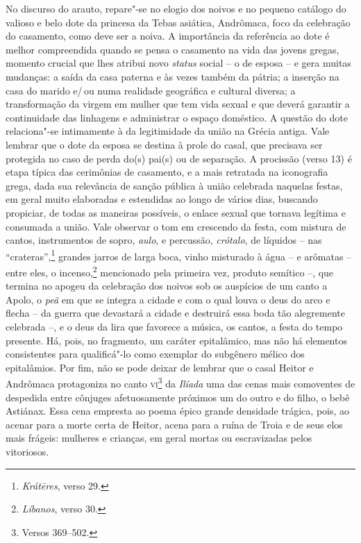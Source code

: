 {No discurso do arauto, repare"-se no
elogio dos noivos e no pequeno catálogo do valioso e belo dote da princesa da
Tebas asiática, Andrômaca, foco da celebração do casamento, como deve ser a noiva.
A importância da
referência ao dote é melhor
compreendida quando se pensa o casamento na vida das jovens gregas, momento
crucial que lhes atribui novo \textit{status} social -- o de esposa -- e gera
muitas mudanças: a saída da casa paterna e às vezes também da pátria; a
inserção na casa do marido e/\,ou numa realidade geográfica e cultural diversa; a
transformação da virgem em mulher que tem vida sexual e que deverá garantir a
continuidade das linhagens e administrar o espaço doméstico. A questão do dote
relaciona"-se intimamente à da legitimidade da união na Grécia antiga. Vale
lembrar que o dote da esposa se destina à prole do casal, que precisava ser
protegida no caso de perda do(s) pai(s) ou de separação. A procissão (verso
13) é etapa típica das cerimônias de casamento, e a mais retratada na iconografia grega, dada sua relevância de sanção pública à união celebrada naquelas festas, em geral muito elaboradas e
estendidas ao longo de vários dias, buscando propiciar, de todas as maneiras
possíveis, o enlace sexual que tornava legítima e consumada a união.
Vale observar o tom em crescendo da festa, com mistura de cantos, instrumentos de sopro, \textit{aulo}, e percussão, \textit{crótalo}, de líquidos -- nas ``crateras'',\footnote{\textit{Krátēres}, verso 29.} grandes jarros de larga boca, vinho misturado à água -- e arômatas  -- entre eles, o incenso,\footnote{\textit{Líbanos}, verso 30.} mencionado pela primeira vez, produto semítico --, que termina no apogeu da celebração dos noivos sob os auspícios de um canto a Apolo, o \textit{peã} em que se integra a cidade e com o qual louva o deus do arco e flecha -- da guerra que devastará a cidade e destruirá essa boda tão alegremente celebrada --, e o deus da lira que favorece a música, os cantos, a festa do tempo presente. 
Há, pois, no fragmento, um caráter epitalâmico, mas não há elementos consistentes para
qualificá"-lo como exemplar do subgênero mélico dos epitalâmios. Por fim, não se
pode deixar de lembrar que o casal Heitor e Andrômaca protagoniza no canto \textsc{vi}\footnote{Versos 369--502.} 
da \textit{Ilíada} uma das cenas mais comoventes de despedida
entre cônjuges afetuosamente próximos um do outro e do filho, o bebê Astiánax.
Essa cena empresta ao poema épico grande densidade trágica, pois, ao acenar
para a morte certa de Heitor, acena para a ruína de Troia e de seus elos mais
frágeis: mulheres e crianças, em geral mortas ou escravizadas pelos vitoriosos.
}
